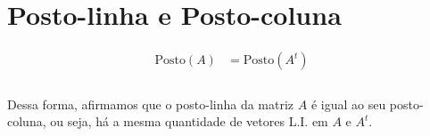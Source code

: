 \documentclass{article}
\newcommand{\posto}[1] {\text{Posto} \left( #1 \right)}
\begin{document}
    \section{Posto-linha e Posto-coluna}
        \begin{align*}
            \posto{A} &= \posto{A^t}\\
        \end{align*}

        \paragraph{}
        Dessa forma, afirmamos que o posto-linha da matriz $A$ é igual ao seu posto-coluna, ou seja, há a mesma quantidade de vetores
        L.I. em $A$ e $A^t$.
\end{document}

